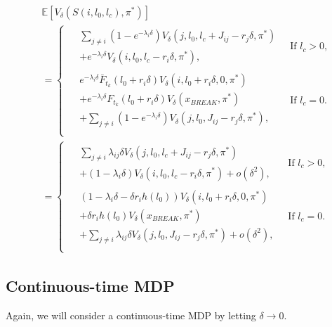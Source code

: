 \begin{equation}\label{eq:MmfmNextState}
\begin{split}
&\mathbb{E}[V_\delta(S(i,l_0,l_c),\pi^*)]\\
&=\begin{cases}
\begin{split}
&\sum\limits_{j\neq i}(1-e^{-\lambda_i \delta})V_\delta(j,l_0,l_c+J_{ij}-r_j\delta,\pi^*)\\
&+e^{-\lambda_i \delta}V_\delta(i,l_0,l_c-r_i\delta,\pi^*),
\end{split}&\ \text{If $l_c>0$,}\\
\begin{split}
&e^{-\lambda_i \delta} \bar{F}_{t_k}(l_0+r_i\delta)V_\delta(i,l_0+r_i\delta,0,\pi^*)\\
&+ e^{-\lambda_i \delta}F_{t_k}(l_0+r_i\delta)V_\delta(x_{BREAK},\pi^*)\\
&+\sum\limits_{j\neq i}(1-e^{-\lambda_i \delta})V_\delta(j,l_0,J_{ij}-r_j\delta,\pi^*),
\end{split}&\ \text{If $l_c=0$.}\\
\end{cases}\\
&=\begin{cases}
\begin{split}
&\sum\limits_{j\neq i}\lambda_{ij}\delta V_\delta(j,l_0,l_c+J_{ij}-r_j\delta,\pi^*)\\
&+(1-\lambda_i \delta)V_\delta(i,l_0,l_c-r_i\delta,\pi^*)+o(\delta^2),
\end{split}
&\ \text{If $l_c>0$,}\\
\begin{split}
&(1-\lambda_i \delta-\delta r_ih(l_0))V_\delta(i,l_0+r_i\delta,0,\pi^*)\\
&+ \delta r_ih(l_0)V_\delta(x_{BREAK},\pi^*)\\
&+\sum\limits_{j\neq i}\lambda_{ij} \delta V_\delta(j,l_0,J_{ij}-r_j\delta,\pi^*)+o(\delta^2),
\end{split}&\ \text{If $l_c=0$.}\\
\end{cases}
\end{split}
\end{equation}

\subsection{Continuous-time MDP}
Again, we will consider a continuous-time MDP by letting $\delta\rightarrow0$.


